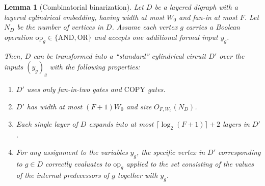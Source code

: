 \documentclass[11pt]{article}
\newtheorem{lemma}[theorem]{Lemma}
\theoremstyle{definition}
\theoremstyle{remark}
\begin{document}
\begin{lemma}[Combinatorial binarization]\label{lem:binarize}
Let $D$ be a layered digraph with a layered cylindrical embedding, having width at most $W_0$ and fan-in at most $F$. Let $N_D$ be the number of vertices in $D$. Assume each vertex $g$ carries a Boolean operation $\mathrm{op}_g\in\{\mathrm{AND},\mathrm{OR}\}$ and accepts one additional formal input $y_g$.

Then, $D$ can be transformed into a ``standard'' cylindrical circuit $D'$ over the inputs $(y_g)_g$ with the following properties:
\begin{enumerate}
    \item $D'$ uses only fan-in-two gates and $\mathrm{COPY}$ gates.
    \item $D'$ has width at most $(F+1)W_0$ and size $O_{F,W_0}(N_D)$.
    \item Each single layer of $D$ expands into at most $\lceil\log_2(F+1)\rceil+2$ layers in $D'$.
    \item For any assignment to the variables $y_g$, the specific vertex in $D'$ corresponding to $g\in D$ correctly evaluates to $\mathrm{op}_g$ applied to the set consisting of the values of the internal predecessors of $g$ together with $y_g$.
\end{enumerate}
\end{lemma}
\end{document}
